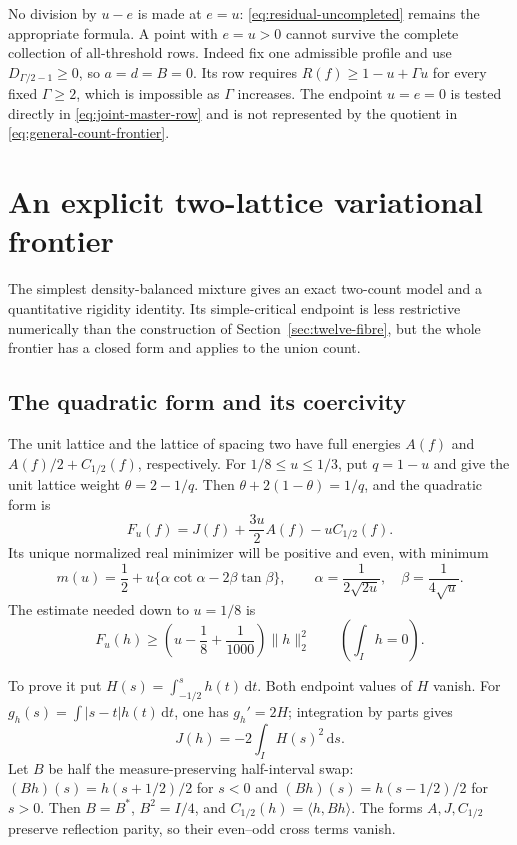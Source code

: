 \documentclass[11pt,reqno]{amsart}
\numberwithin{equation}{section}
\newcommand{\dd}{\,\mathrm d}
\begin{document}
No division by $u-e$ is made at $e=u$:
\eqref{eq:residual-uncompleted} remains the appropriate formula.
A point with $e=u>0$ cannot survive the complete collection of
all-threshold rows. Indeed fix one admissible profile and use
$D_{\Gamma/2-1}\ge0$, so $a=d=B=0$. Its row requires
$R(f)\ge1-u+\Gamma u$ for every fixed $\Gamma\ge2$, which is
impossible as $\Gamma$ increases. The endpoint $u=e=0$
is tested directly in \eqref{eq:joint-master-row} and is not
represented by the quotient in \eqref{eq:general-count-frontier}.

\section{An explicit two-lattice variational frontier}
\label{sec:two-lattice}

The simplest density-balanced mixture gives an exact two-count
model and a quantitative rigidity identity. Its simple-critical
endpoint is less restrictive numerically than the construction
of Section~\ref{sec:twelve-fibre}, but the whole frontier has
a closed form and applies to the union count.

\subsection{The quadratic form and its coercivity}

The unit lattice and the lattice of spacing two have full energies
$A(f)$ and $A(f)/2+C_{1/2}(f)$, respectively.
For $1/8\le u\le1/3$, put $q=1-u$ and give the unit lattice
weight $\theta=2-1/q$. Then
$\theta+2(1-\theta)=1/q$, and the quadratic form is
\begin{equation}
 F_u(f)=J(f)+\frac{3u}{2}A(f)-uC_{1/2}(f).
 \label{eq:two-lattice-form}
\end{equation}
Its unique normalized real minimizer will be positive and even,
with minimum
\begin{equation}
 m(u)=\frac12+u\{\alpha\cot\alpha-2\beta\tan\beta\},
 \qquad
 \alpha=\frac1{2\sqrt{2u}},\quad
 \beta=\frac1{4\sqrt u}.
 \label{eq:two-lattice-minimum}
\end{equation}
The estimate needed down to $u=1/8$ is
\begin{equation}
 F_u(h)\ge\left(u-\frac18+\frac1{1000}\right)\|h\|_2^2
 \qquad\left(\int_Ih=0\right).
 \label{eq:two-lattice-coercivity}
\end{equation}

To prove it put $H(s)=\int_{-1/2}^sh(t)\dd t$.
Both endpoint values of $H$ vanish. For
$g_h(s)=\int|s-t|h(t)\dd t$, one has $g_h'=2H$;
integration by parts gives
\begin{equation}
 J(h)=-2\int_IH(s)^2\dd s.
 \label{eq:primitive-negative-energy}
\end{equation}
Let $B$ be half the measure-preserving half-interval swap:
$(Bh)(s)=h(s+1/2)/2$ for $s<0$ and
$(Bh)(s)=h(s-1/2)/2$ for $s>0$.
Then $B=B^*$, $B^2=I/4$, and
$C_{1/2}(h)=\langle h,Bh\rangle$.
The forms $A,J,C_{1/2}$ preserve reflection parity,
so their even--odd cross terms vanish.
\end{document}
